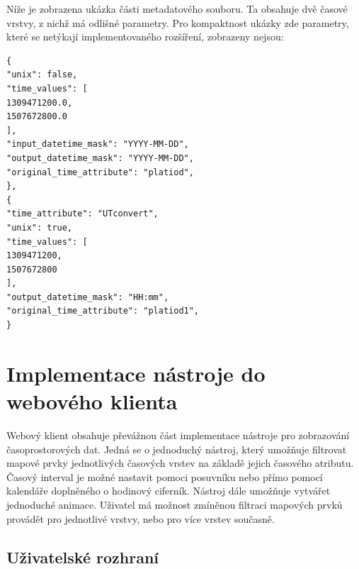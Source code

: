 \bigskip
\noindent

Níže je zobrazena ukázka části metadatového souboru. Ta obsahuje dvě
časové vrstvy, z nichž má odlišné parametry. Pro kompaktnost
ukázky zde parametry, které se netýkají implementovaného rozšíření,
zobrazeny nejsou:

\begin{verbatim}
{
"unix": false,
"time_values": [
1309471200.0,
1507672800.0
],
"input_datetime_mask": "YYYY-MM-DD",
"output_datetime_mask": "YYYY-MM-DD",
"original_time_attribute": "platiod",
},
{
"time_attribute": "UTconvert",
"unix": true,
"time_values": [
1309471200,
1507672800
],
"output_datetime_mask": "HH:mm",
"original_time_attribute": "platiod1",
}
\end{verbatim}

\newpage
\section{Implementace nástroje do webového klienta}

Webový klient obsahuje převážnou část implementace nástroje pro zobrazování časoprostorových dat. Jedná se o jednoduchý nástroj, který umožňuje
filtrovat mapové prvky jednotlivých časových vrstev na základě jejich
časového atributu. Časový interval je možné nastavit pomoci posuvníku
nebo přímo pomocí kalendáře doplněného o hodinový ciferník. Nástroj dále 
umožňuje vytvářet jednoduché animace. Uživatel
má možnost zmíněnou filtraci mapových prvků provádět pro jednotlivé
vrstvy, nebo pro více vrstev současně.

\subsection{Uživatelské rozhraní}
\label{sssec:gisquick-client-ui}

